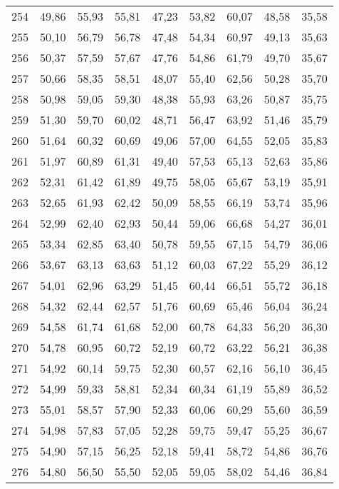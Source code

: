 \begin{longtable}{c c c c c c c c c}
      254& 	49,86& 	55,93& 	55,81& 	47,23& 	53,82& 	60,07& 	48,58& 	35,58 \\
      255& 	50,10& 	56,79& 	56,78& 	47,48& 	54,34& 	60,97& 	49,13& 	35,63 \\
      256& 	50,37& 	57,59& 	57,67& 	47,76& 	54,86& 	61,79& 	49,70& 	35,67 \\
      257& 	50,66& 	58,35& 	58,51& 	48,07& 	55,40& 	62,56& 	50,28& 	35,70 \\
      258& 	50,98& 	59,05& 	59,30& 	48,38& 	55,93& 	63,26& 	50,87& 	35,75 \\
      259& 	51,30& 	59,70& 	60,02& 	48,71& 	56,47& 	63,92& 	51,46& 	35,79 \\
      260& 	51,64& 	60,32& 	60,69& 	49,06& 	57,00& 	64,55& 	52,05& 	35,83 \\
      261& 	51,97& 	60,89& 	61,31& 	49,40& 	57,53& 	65,13& 	52,63& 	35,86 \\
      262& 	52,31& 	61,42& 	61,89& 	49,75& 	58,05& 	65,67& 	53,19& 	35,91 \\
      263& 	52,65& 	61,93& 	62,42& 	50,09& 	58,55& 	66,19& 	53,74& 	35,96 \\
      264& 	52,99& 	62,40& 	62,93& 	50,44& 	59,06& 	66,68& 	54,27& 	36,01 \\
      265& 	53,34& 	62,85& 	63,40& 	50,78& 	59,55& 	67,15& 	54,79& 	36,06 \\
      266& 	53,67& 	63,13& 	63,63& 	51,12& 	60,03& 	67,22& 	55,29& 	36,12 \\
      267& 	54,01& 	62,96& 	63,29& 	51,45& 	60,44& 	66,51& 	55,72& 	36,18 \\
      268& 	54,32& 	62,44& 	62,57& 	51,76& 	60,69& 	65,46& 	56,04& 	36,24 \\
      269& 	54,58& 	61,74& 	61,68& 	52,00& 	60,78& 	64,33& 	56,20& 	36,30 \\
      270& 	54,78& 	60,95& 	60,72& 	52,19& 	60,72& 	63,22& 	56,21& 	36,38 \\
      271& 	54,92& 	60,14& 	59,75& 	52,30& 	60,57& 	62,16& 	56,10& 	36,45 \\
      272& 	54,99& 	59,33& 	58,81& 	52,34& 	60,34& 	61,19& 	55,89& 	36,52 \\
      273& 	55,01& 	58,57& 	57,90& 	52,33& 	60,06& 	60,29& 	55,60& 	36,59 \\
      274& 	54,98& 	57,83& 	57,05& 	52,28& 	59,75& 	59,47& 	55,25& 	36,67 \\
      275& 	54,90& 	57,15& 	56,25& 	52,18& 	59,41& 	58,72& 	54,86& 	36,76 \\
      276& 	54,80& 	56,50& 	55,50& 	52,05& 	59,05& 	58,02& 	54,46& 	36,84 \\

\end{longtable}
